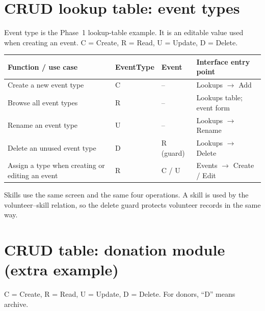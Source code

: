 \appendix

\section{CRUD lookup table: event types}
\label{app:crud-event-types}

Event type is the Phase~1 lookup-table example. It is an editable value used when creating an event. C = Create, R = Read, U = Update, D = Delete.

\begin{center}
\small
\begin{tabularx}{\textwidth}{@{}L{0.34\textwidth}L{0.13\textwidth}L{0.12\textwidth}Y@{}}
\toprule
\textbf{Function / use case} & \textbf{EventType} & \textbf{Event} & \textbf{Interface entry point} \\
\midrule
Create a new event type & C & -- & Lookups \(\rightarrow\) Add \\
Browse all event types & R & -- & Lookups table; event form \\
Rename an event type & U & -- & Lookups \(\rightarrow\) Rename \\
Delete an unused event type & D & R (guard) & Lookups \(\rightarrow\) Delete \\
Assign a type when creating or editing an event & R & C / U & Events \(\rightarrow\) Create / Edit \\
\bottomrule
\end{tabularx}
\end{center}

Skills use the same screen and the same four operations. A skill is used by the volunteer--skill relation, so the delete guard protects volunteer records in the same way.

\section{CRUD table: donation module (extra example)}
\label{app:crud-donations}

C = Create, R = Read, U = Update, D = Delete. For donors, ``D'' means archive.

